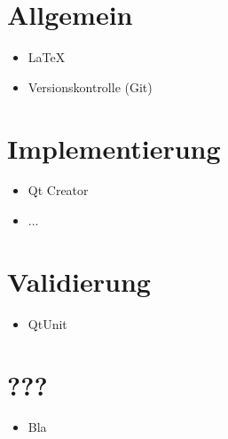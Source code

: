 
\section{Allgemein}
	\begin{itemize}
		\item \LaTeX
		\item Versionskontrolle (Git)
	\end{itemize}
\section{Implementierung}
	\begin{itemize}
		\item Qt Creator
		\item ...
	\end{itemize}
\section{Validierung}
	\begin{itemize}
		\item QtUnit
	\end{itemize}
\section{???}
	\begin{itemize}
		\item Bla
	\end{itemize}
